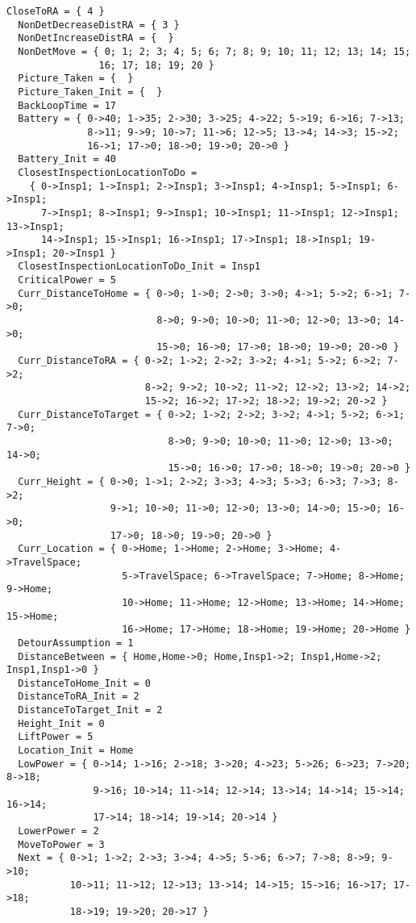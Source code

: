 \documentclass[12pt]{extarticle}
\begin{document}
\begin{lstlisting}[basicstyle=\tiny]
  CloseToRA = { 4 }
  NonDetDecreaseDistRA = { 3 }
  NonDetIncreaseDistRA = {  }
  NonDetMove = { 0; 1; 2; 3; 4; 5; 6; 7; 8; 9; 10; 11; 12; 13; 14; 15;
                16; 17; 18; 19; 20 }
  Picture_Taken = {  }
  Picture_Taken_Init = {  }
  BackLoopTime = 17
  Battery = { 0->40; 1->35; 2->30; 3->25; 4->22; 5->19; 6->16; 7->13;
              8->11; 9->9; 10->7; 11->6; 12->5; 13->4; 14->3; 15->2;
              16->1; 17->0; 18->0; 19->0; 20->0 }
  Battery_Init = 40
  ClosestInspectionLocationToDo =
    { 0->Insp1; 1->Insp1; 2->Insp1; 3->Insp1; 4->Insp1; 5->Insp1; 6->Insp1;
      7->Insp1; 8->Insp1; 9->Insp1; 10->Insp1; 11->Insp1; 12->Insp1; 13->Insp1;
      14->Insp1; 15->Insp1; 16->Insp1; 17->Insp1; 18->Insp1; 19->Insp1; 20->Insp1 }
  ClosestInspectionLocationToDo_Init = Insp1
  CriticalPower = 5
  Curr_DistanceToHome = { 0->0; 1->0; 2->0; 3->0; 4->1; 5->2; 6->1; 7->0;
                          8->0; 9->0; 10->0; 11->0; 12->0; 13->0; 14->0;
                          15->0; 16->0; 17->0; 18->0; 19->0; 20->0 }
  Curr_DistanceToRA = { 0->2; 1->2; 2->2; 3->2; 4->1; 5->2; 6->2; 7->2;
                        8->2; 9->2; 10->2; 11->2; 12->2; 13->2; 14->2;
                        15->2; 16->2; 17->2; 18->2; 19->2; 20->2 }
  Curr_DistanceToTarget = { 0->2; 1->2; 2->2; 3->2; 4->1; 5->2; 6->1; 7->0;
                            8->0; 9->0; 10->0; 11->0; 12->0; 13->0; 14->0;
                            15->0; 16->0; 17->0; 18->0; 19->0; 20->0 }
  Curr_Height = { 0->0; 1->1; 2->2; 3->3; 4->3; 5->3; 6->3; 7->3; 8->2;
                  9->1; 10->0; 11->0; 12->0; 13->0; 14->0; 15->0; 16->0;
                  17->0; 18->0; 19->0; 20->0 }
  Curr_Location = { 0->Home; 1->Home; 2->Home; 3->Home; 4->TravelSpace;
                    5->TravelSpace; 6->TravelSpace; 7->Home; 8->Home; 9->Home;
                    10->Home; 11->Home; 12->Home; 13->Home; 14->Home; 15->Home;
                    16->Home; 17->Home; 18->Home; 19->Home; 20->Home }
  DetourAssumption = 1
  DistanceBetween = { Home,Home->0; Home,Insp1->2; Insp1,Home->2; Insp1,Insp1->0 }
  DistanceToHome_Init = 0
  DistanceToRA_Init = 2
  DistanceToTarget_Init = 2
  Height_Init = 0
  LiftPower = 5
  Location_Init = Home
  LowPower = { 0->14; 1->16; 2->18; 3->20; 4->23; 5->26; 6->23; 7->20; 8->18;
               9->16; 10->14; 11->14; 12->14; 13->14; 14->14; 15->14; 16->14;
               17->14; 18->14; 19->14; 20->14 }
  LowerPower = 2
  MoveToPower = 3
  Next = { 0->1; 1->2; 2->3; 3->4; 4->5; 5->6; 6->7; 7->8; 8->9; 9->10;
           10->11; 11->12; 12->13; 13->14; 14->15; 15->16; 16->17; 17->18;
           18->19; 19->20; 20->17 }

\end{lstlisting}
\end{document}
